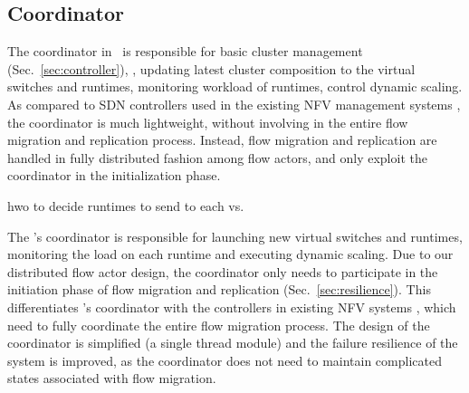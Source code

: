 


\subsection{Coordinator}
\label{sec:coordinator}

The coordinator in \nfactor~is responsible for basic cluster management (Sec.~\ref{sec:controller}), \eg, updating latest cluster composition to the virtual switches and runtimes, monitoring workload of runtimes, control dynamic scaling. %
As compared to SDN controllers used in the existing NFV management systems \cite{gember2015opennf, rajagopalan2013split}%
, the coordinator is much lightweight, without involving in the entire flow migration and replication process.%
 Instead, flow migration and replication are handled in fully distributed fashion among flow actors, and only exploit the coordinator in the initialization phase.

hwo to decide runtimes to send to each vs.

The \nfactor's coordinator is responsible for launching new virtual switches and runtimes, monitoring the load on each runtime and executing dynamic scaling. Due to our distributed flow actor design, the coordinator only needs to participate in the initiation phase of flow migration and replication (Sec.~\ref{sec:resilience}). This differentiates \nfactor's coordinator with the controllers in existing NFV systems \cite{gember2015opennf}\cite{rajagopalan2013split}, which need to fully coordinate the entire flow migration process.
The design of the coordinator is simplified (a single thread module) and the failure resilience of the system is improved, as the coordinator does not need to maintain complicated states associated with flow migration.

